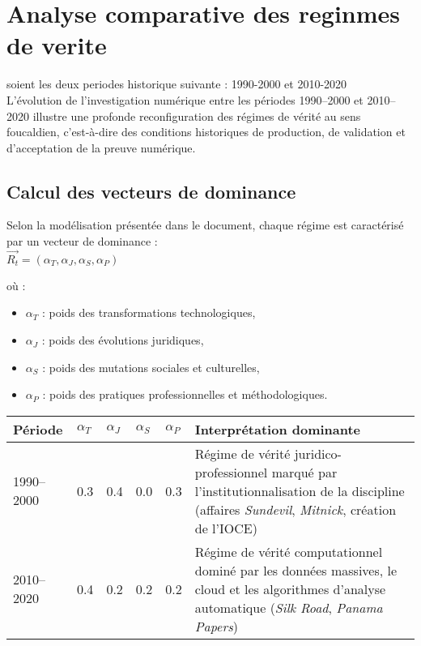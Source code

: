\documentclass[12pt, a4em]{article}
\begin{document}
	\section{Analyse comparative des reginmes de verite}
	
	soient les deux periodes historique suivante : 1990-2000 et 2010-2020\\
	

	L’évolution de l’investigation numérique entre les périodes 1990–2000 et 2010–2020 illustre une profonde reconfiguration des régimes de vérité au sens foucaldien, c’est-à-dire des conditions historiques de production, de validation et d’acceptation de la preuve numérique.
	
	\subsection{ Calcul des vecteurs de dominance}
	
	Selon la modélisation présentée dans le document, chaque régime est caractérisé par un vecteur de dominance :\\
	
	$\vec{R_t} = (\alpha_T, \alpha_J, \alpha_S, \alpha_P)$
	
	où :
	\begin{itemize}
		\item $\alpha_T$ : poids des transformations technologiques,
		\item $\alpha_J$ : poids des évolutions juridiques,
		\item $\alpha_S$ : poids des mutations sociales et culturelles,
		\item $\alpha_P$ : poids des pratiques professionnelles et méthodologiques.
	\end{itemize}
	
	\begin{center}
		\begin{tabular}{|p{3cm} p{2cm} p{2cm} p{2cm} p{2cm} p{6cm}|}
			\hline
			\textbf{Période} & $\alpha_T$ & $\alpha_J$ & $\alpha_S$ & $\alpha_P$ & \textbf{Interprétation dominante} \\ \hline
			1990–2000 & 0.3 & 0.4 & 0.0 & 0.3 & Régime de vérité juridico-professionnel marqué par l’institutionnalisation de la discipline (affaires \textit{Sundevil}, \textit{Mitnick}, création de l’IOCE) \\ \hline
			2010–2020 & 0.4 & 0.2 & 0.2 & 0.2 & Régime de vérité computationnel dominé par les données massives, le cloud et les algorithmes d’analyse automatique (\textit{Silk Road}, \textit{Panama Papers}) \\ \hline
		\end{tabular}
	\end{center}
	
\end{document}
